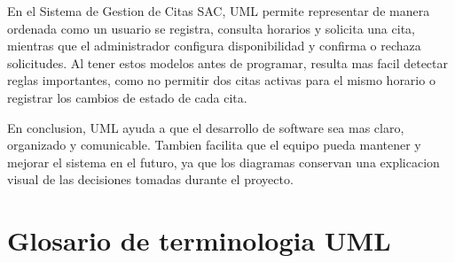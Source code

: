 \documentclass[12pt,letterpaper]{article}
\begin{document}
En el Sistema de Gestion de Citas SAC, UML permite representar de manera ordenada como un usuario se registra, consulta horarios y solicita una cita, mientras que el administrador configura disponibilidad y confirma o rechaza solicitudes. Al tener estos modelos antes de programar, resulta mas facil detectar reglas importantes, como no permitir dos citas activas para el mismo horario o registrar los cambios de estado de cada cita.

En conclusion, UML ayuda a que el desarrollo de software sea mas claro, organizado y comunicable. Tambien facilita que el equipo pueda mantener y mejorar el sistema en el futuro, ya que los diagramas conservan una explicacion visual de las decisiones tomadas durante el proyecto.

\section{Glosario de terminologia UML}
\end{document}
